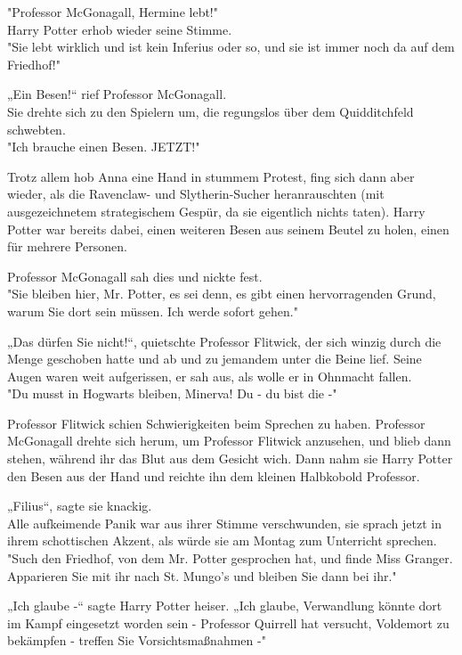 {"Professor McGonagall, Hermine lebt!"\\ Harry Potter erhob wieder seine Stimme.\\ "Sie lebt wirklich und ist kein Inferius oder so, und sie ist immer noch da auf dem Friedhof!"

„Ein Besen!“ rief Professor McGonagall.\\ Sie drehte sich zu den Spielern um, die regungslos über dem Quidditchfeld schwebten.\\ "Ich brauche einen Besen. JETZT!"

Trotz allem hob Anna eine Hand in stummem Protest, fing sich dann aber wieder, als die Ravenclaw- und Slytherin-Sucher heranrauschten (mit ausgezeichnetem strategischem Gespür, da sie eigentlich nichts taten). Harry Potter war bereits dabei, einen weiteren Besen aus seinem Beutel zu holen, einen für mehrere Personen.

Professor McGonagall sah dies und nickte fest.\\ "Sie bleiben hier, Mr. Potter, es sei denn, es gibt einen hervorragenden Grund, warum Sie dort sein müssen. Ich werde sofort gehen."

„Das dürfen Sie nicht!“, quietschte Professor Flitwick, der sich winzig durch die Menge geschoben hatte und ab und zu jemandem unter die Beine lief. Seine Augen waren weit aufgerissen, er sah aus, als wolle er in Ohnmacht fallen.\\ "Du musst in Hogwarts bleiben, Minerva! Du - du bist die -"

Professor Flitwick schien Schwierigkeiten beim Sprechen zu haben. Professor McGonagall drehte sich herum, um Professor Flitwick anzusehen, und blieb dann stehen, während ihr das Blut aus dem Gesicht wich. Dann nahm sie Harry Potter den Besen aus der Hand und reichte ihn dem kleinen Halbkobold Professor.

„Filius“, sagte sie knackig.\\ Alle aufkeimende Panik war aus ihrer Stimme verschwunden, sie sprach jetzt in ihrem schottischen Akzent, als würde sie am Montag zum Unterricht sprechen.\\ "Such den Friedhof, von dem Mr. Potter gesprochen hat, und finde Miss Granger. Apparieren Sie mit ihr nach St. Mungo's und bleiben Sie dann bei ihr."

„Ich glaube -“ sagte Harry Potter heiser. „Ich glaube, Verwandlung könnte dort im Kampf eingesetzt worden sein - Professor Quirrell hat versucht, Voldemort zu bekämpfen - treffen Sie Vorsichtsmaßnahmen -"

}
